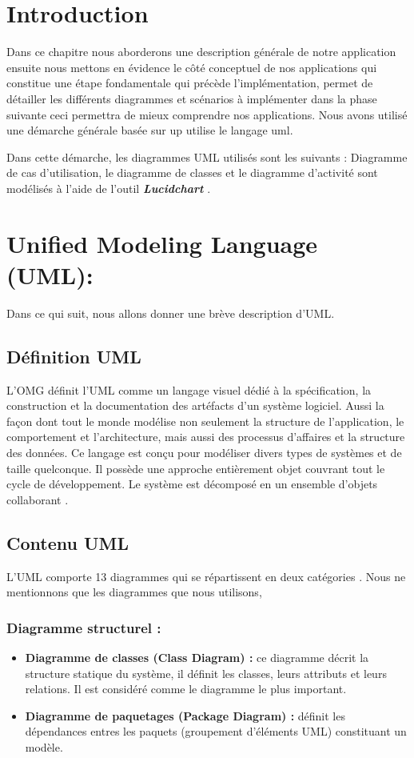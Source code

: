  \section*{Introduction}

  
Dans ce chapitre nous aborderons une description générale de notre application ensuite nous mettons en évidence le côté conceptuel de nos applications qui constitue une étape fondamentale qui précède l’implémentation, permet de détailler les différents diagrammes et scénarios à implémenter dans la phase suivante ceci permettra de mieux comprendre nos applications. Nous avons utilisé une démarche générale basée sur \ac{up} utilise le langage \ac{uml}. 

Dans cette démarche, les diagrammes UML utilisés sont les suivants : Diagramme de cas d’utilisation, le diagramme de classes et le diagramme d'activité sont modélisés à l’aide de l’outil \textit{\textbf{Lucidchart}} .



 \section{Unified Modeling Language (UML):}
 Dans ce qui suit, nous allons donner une brève description d’UML.
 \subsection{ Définition UML }
 L’OMG définit l’UML comme un langage visuel dédié à la spécification, la construction et la documentation des artéfacts d’un système logiciel. Aussi la façon dont tout le monde modélise non seulement la structure de l’application, le comportement et l’architecture, mais aussi des processus d’affaires et la structure des données. Ce langage est conçu pour modéliser divers types de systèmes et de taille quelconque. Il possède une approche entièrement objet couvrant tout le cycle de développement. Le système est décomposé en un ensemble d’objets collaborant \parencite{uml}.
 
 \subsection{Contenu UML}
 
 L’UML comporte 13 diagrammes qui se répartissent en deux catégories \parencite{uml}. Nous ne mentionnons que les diagrammes que nous utilisons, 
 
 \subsubsection{Diagramme structurel : }
 \begin{itemize}
 \item \textbf{Diagramme de classes (Class Diagram) : }ce diagramme décrit la structure statique du système, il définit les classes, leurs attributs et leurs relations. Il est considéré comme le diagramme le plus important.
  \item  \textbf{Diagramme de paquetages (Package Diagram) : }définit les dépendances entres les paquets (groupement d’éléments UML) constituant un modèle. 
 \end{itemize}
 

